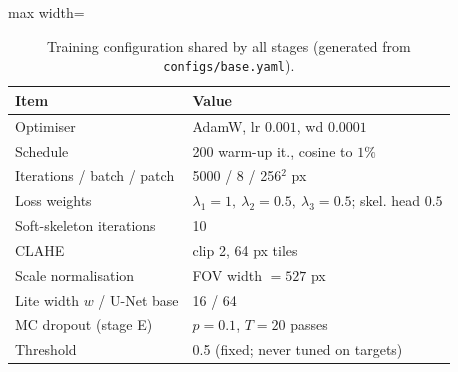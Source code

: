 \begin{table}[t]
\centering
\caption{Training configuration shared by all stages (generated from \texttt{configs/base.yaml}).}
\label{tab:hparams}
\small
\begin{adjustbox}{max width=\columnwidth}\begin{tabular}{ll}
\toprule
Item & Value \\
\midrule
Optimiser & AdamW, lr $0.001$, wd $0.0001$ \\
Schedule & 200 warm-up it., cosine to $1\%$ \\
Iterations / batch / patch & 5000 / 8 / 256$^2$ px \\
Loss weights & $\lambda_1{=}1,\ \lambda_2{=}0.5,\ \lambda_3{=}0.5$; skel. head $0.5$ \\
Soft-skeleton iterations & 10 \\
CLAHE & clip 2, 64 px tiles \\
Scale normalisation & FOV width $=527$ px \\
Lite width $w$ / U-Net base & 16 / 64 \\
MC dropout (stage E) & $p{=}0.1$, $T{=}20$ passes \\
Threshold & 0.5 (fixed; never tuned on targets) \\
\bottomrule
\end{tabular}\end{adjustbox}
\end{table}